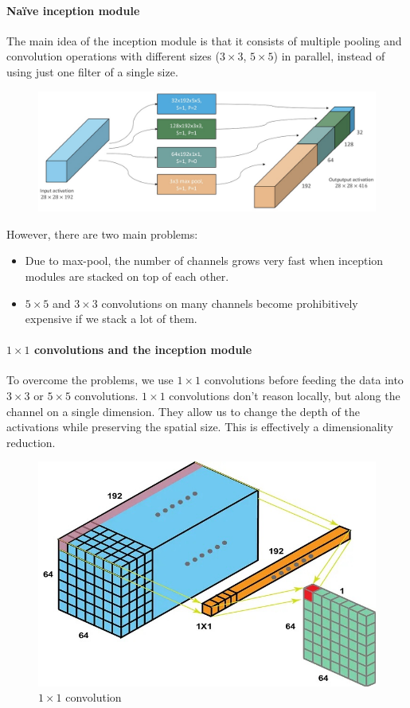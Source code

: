 \paragraph{Naïve inception module}
The main idea of the inception module is that it consists of multiple pooling and convolution operations with different sizes ($3\times 3$, $5\times 5$) in parallel, instead of using just one filter of a single size.
\begin{figure}[htbp]
  \centering
  \includegraphics[width=0.8\linewidth]{./img/inception_naive.jpg}
\end{figure}
However, there are two main problems:
\begin{itemize}
  \item Due to max-pool, the number of channels grows very fast when inception modules are stacked on top of each other.
  \item $5 \times 5$ and $3 \times 3$ convolutions on many channels become prohibitively expensive if we stack a lot of them.
\end{itemize}

\paragraph{$1 \times 1$ convolutions and the inception module}
To overcome the problems, we use $1 \times 1$ convolutions before feeding the data into $3\times 3$ or $5 \times 5$ convolutions.
$1\times 1$ convolutions don't reason locally, but along the channel on a single dimension.
They allow us to change the depth of the activations while preserving the spatial size.
This is effectively a dimensionality reduction.

\begin{figure}[htbp]
  \centering
  \includegraphics[width=0.8\linewidth]{./img/11conv.jpg}
  \caption{$1 \times 1$ convolution}
\end{figure}

